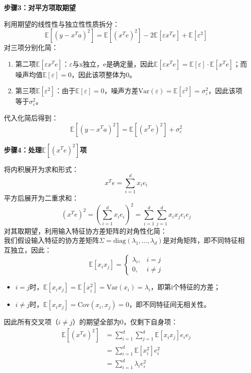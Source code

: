 \documentclass[10pt]{article}
\numberwithin{equation}{section}
\theoremstyle{plain}
\theoremstyle{definition}
\theoremstyle{remark}
\begin{document}
{\par\vspace{0.8ex}\noindent\normalsize\bfseries\color{secblue} 步骤3：对平方项取期望\par}
利用期望的线性性与独立性性质拆分：
\[ \mathbb{E}\left[ (y - x^T a)^2 \right] = \mathbb{E}\left[ (x^T e)^2 \right] - 2 \mathbb{E}\left[ \varepsilon x^T e \right] + \mathbb{E}\left[ \varepsilon^2 \right] \]
对三项分别化简：
\begin{enumerate}[label=\arabic*., leftmargin=*]
    \item 第二项$\mathbb{E}\left[ \varepsilon x^T e \right]$：$\varepsilon$与x独立，e是确定量，因此$\mathbb{E}\left[ \varepsilon x^T e \right] = \mathbb{E}[\varepsilon] \cdot \mathbb{E}\left[ x^T e \right]$；而噪声均值$\mathbb{E}[\varepsilon] = 0$，因此该项整体为0。
    \item 第三项$\mathbb{E}\left[ \varepsilon^2 \right]$：由于$\mathbb{E}[\varepsilon] = 0$，噪声方差$\text{Var}(\varepsilon) = \mathbb{E}[\varepsilon^2] = \sigma_\varepsilon^2$，因此该项等于$\sigma_\varepsilon^2$。
\end{enumerate}
代入化简后得到：
\[ \mathbb{E}\left[ (y - x^T a)^2 \right] = \mathbb{E}\left[ (x^T e)^2 \right] + \sigma_\varepsilon^2 \]

{\par\vspace{0.8ex}\noindent\normalsize\bfseries\color{secblue} 步骤4：处理$\mathbb{E}\left[ (x^T e)^2 \right]$项\par}
将内积展开为求和形式：
\[ x^T e = \sum_{i=1}^d x_i e_i \]
平方后展开为二重求和：
\[ (x^T e)^2 = \left( \sum_{i=1}^d x_i e_i \right)^2 = \sum_{i=1}^d \sum_{j=1}^d x_i x_j e_i e_j \]
对其取期望，利用输入特征协方差矩阵的对角性化简：\\
我们假设输入特征的协方差矩阵$\Sigma = \text{diag}(\lambda_1,\dots,\lambda_d)$是对角矩阵，即不同特征相互独立，因此：
\[
\mathbb{E}[x_i x_j] =
\begin{cases}
\lambda_i, & i = j \\
0, & i \neq j
\end{cases}
\]
\begin{itemize}[leftmargin=*,nosep]
    \item $i=j$时，$\mathbb{E}[x_i x_j] = \mathbb{E}[x_i^2] = \text{Var}(x_i) = \lambda_i$，即第i个特征的方差；
    \item $i \neq j$时，$\mathbb{E}[x_i x_j] = \text{Cov}(x_i,x_j) = 0$，即不同特征间无相关性。
\end{itemize}
因此所有交叉项（$i \neq j$）的期望全部为0，仅剩下自身项：
\[
\begin{aligned}
\mathbb{E}\left[ (x^T e)^2 \right] &= \sum_{i=1}^d \sum_{j=1}^d \mathbb{E}[x_i x_j] e_i e_j \\
&= \sum_{i=1}^d \mathbb{E}[x_i^2] e_i^2 \\
&= \sum_{i=1}^d \lambda_i e_i^2
\end{aligned}
\]
\end{document}
